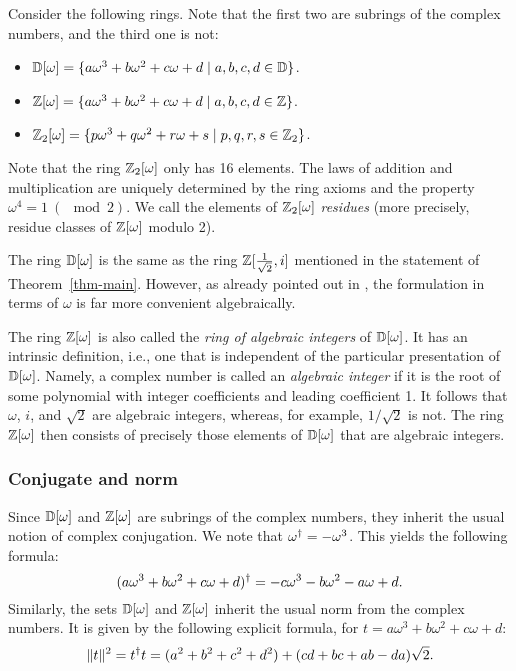 \begin{definition}
  Consider the following rings. Note that the first two are subrings of the complex numbers, and
  the third one is not:
  \begin{itemize}
    \item $\mathbb{D}[\omega] = \{a\omega^3+b\omega^2+c\omega+d \mid a,b,c,d\in\mathbb{D}\}$.
    \item $\mathbb{Z}[\omega] = \{a\omega^3+b\omega^2+c\omega+d \mid a,b,c,d\in\mathbb{Z}\}$.
    \item $\mathbb{Z}_2[\omega] = \{p\omega^3+q\omega^2+r\omega+s \mid p,q,r,s\in\mathbb{Z}_2\}$.
  \end{itemize}
  Note that the ring $\mathbb{Z}_2[\omega]$ only has 16 elements. The laws of addition and multiplication are
  uniquely determined by the ring axioms and the property $\omega^4=1\ (\mod 2)$. We call the
  elements of $\mathbb{Z}_2[\omega]$ {\em residues} (more precisely, residue classes of $\mathbb{Z}[\omega]$ modulo 2).
\end{definition}

\begin{remark}
  The ring $\mathbb{D}[\omega]$ is the same as the ring $\mathbb{Z}[\frac1{\sqrt{2}},i]$ mentioned in the statement of
  Theorem~\ref{thm-main}. However, as already pointed out in {\cite{Kliuchnikov-et-al}}, the
  formulation in terms of $\omega$ is far more convenient algebraically.
\end{remark}

\begin{remark}
  The ring $\mathbb{Z}[\omega]$ is also called the {\em ring of algebraic integers} of $\mathbb{D}[\omega]$. It has an intrinsic
  definition, i.e., one that is independent of the particular presentation of $\mathbb{D}[\omega]$. Namely, a
  complex number is called an {\em algebraic integer} if it is the root of some polynomial with
  integer coefficients and leading coefficient 1. It follows that $\omega$, $i$, and $\sqrt{2}$ are
  algebraic integers, whereas, for example, $1/\sqrt{2}$ is not. The ring $\mathbb{Z}[\omega]$ then consists of
  precisely those elements of $\mathbb{D}[\omega]$ that are algebraic integers.
\end{remark}

\subsubsection{Conjugate and norm} %
\label{ssub:conjugate_and_norm}
\begin{remark}
  Since $\mathbb{D}[\omega]$ and $\mathbb{Z}[\omega]$ are subrings of the complex numbers, they inherit the usual notion of
  complex conjugation. We note that $\omega^{\dagger} = -\omega^3$. This yields the following formula:
  \begin{equation}\label{eqn-adjoint}
    (a\omega^3+b\omega^2+c\omega+d)^{\dagger} = -c\omega^3-b\omega^2-a\omega+d.
  \end{equation}
  Similarly, the sets $\mathbb{D}[\omega]$ and $\mathbb{Z}[\omega]$ inherit the usual norm from the complex numbers. It is given
  by the following explicit formula, for $t=a\omega^3+b\omega^2+c\omega+d$:
  \begin{equation}\label{eqn-cplx-norm}
    \|t\|^2 = t^{\dagger} t = (a^2+b^2+c^2+d^2) + (cd+bc+ab-da) \sqrt{2}.
  \end{equation}
\end{remark}

